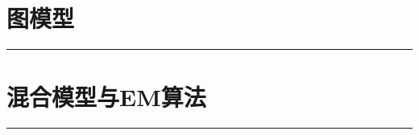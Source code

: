 \documentclass{book}
\renewcommand {\thetable} {\thechapter{}.\arabic{table}}
\renewcommand {\thefigure} {\thechapter{}.\arabic{figure}}
\numberwithin{equation}{chapter}
\begin{document}
	\chapter{图模型}
	\noindent\rule[0.25\baselineskip]{\textwidth}{1pt}
	\renewcommand {\thetable} {\thechapter{}.\arabic{table}}
	\renewcommand {\thefigure} {\thechapter{}.\arabic{figure}}

	\chapter{混合模型与EM算法}
	\noindent\rule[0.25\baselineskip]{\textwidth}{1pt}
	\renewcommand {\thetable} {\thechapter{}.\arabic{table}}
	\renewcommand {\thefigure} {\thechapter{}.\arabic{figure}}
\end{document}
